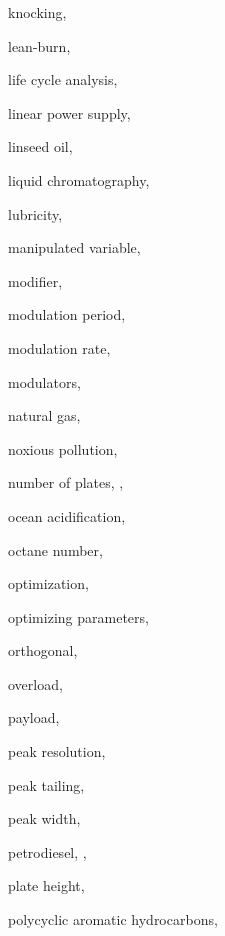 \begin{theindex}
  \item \lowercase {knocking}, 
  \item \lowercase {lean-burn}, 
  \item \lowercase {life cycle analysis}, 
  \item \lowercase {linear power supply}, 
  \item \lowercase {linseed oil}, 
  \item \lowercase {liquid chromatography}, 
  \item \lowercase {lubricity}, 
  \item \lowercase {manipulated variable}, 
  \item \lowercase {modifier}, 
  \item \lowercase {modulation period}, 
  \item \lowercase {modulation rate}, 
  \item \lowercase {modulators}, 
  \item \lowercase {natural gas}, 
  \item \lowercase {noxious pollution}, 
  \item \lowercase {number of plates}, , 
  \item \lowercase {ocean acidification}, 
  \item \lowercase {octane number}, 
  \item \lowercase {optimization}, 
  \item \lowercase {optimizing parameters}, 
  \item \lowercase {orthogonal}, 
  \item \lowercase {overload}, 
  \item \lowercase {payload}, 
  \item \lowercase {peak resolution}, 
  \item \lowercase {peak tailing}, 
  \item \lowercase {peak width}, 
  \item \lowercase {petrodiesel}, , 
  \item \lowercase {plate height}, 
  \item \lowercase {polycyclic aromatic hydrocarbons}, 

\end{theindex}
